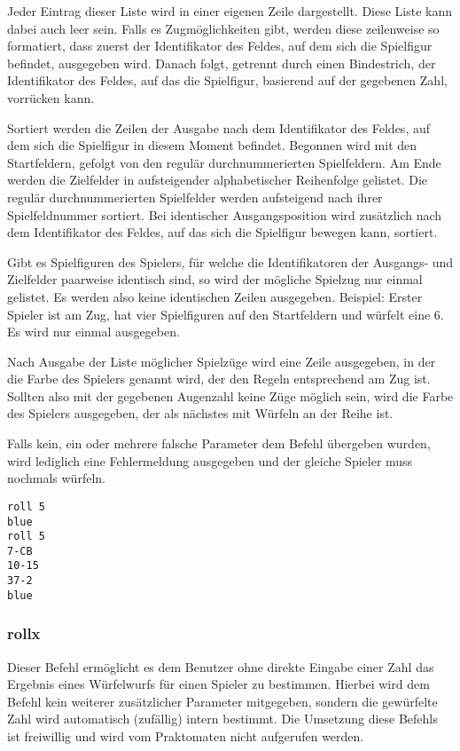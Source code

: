 Jeder Eintrag dieser Liste wird in einer eigenen Zeile dargestellt. Diese Liste kann dabei auch leer sein. Falls es Zugmöglichkeiten gibt, werden diese zeilenweise so formatiert, dass zuerst der Identifikator des Feldes, auf dem sich die Spielfigur befindet, ausgegeben wird. Danach folgt, getrennt durch einen Bindestrich, der Identifikator des Feldes, auf das die Spielfigur, basierend auf der gegebenen Zahl, vorrücken kann.

Sortiert werden die Zeilen der Ausgabe nach dem Identifikator des Feldes, auf dem sich die Spielfigur in diesem Moment befindet. Begonnen wird mit den Startfeldern, gefolgt von den regulär durchnummerierten Spielfeldern. Am Ende werden die Zielfelder in aufsteigender alphabetischer Reihenfolge gelistet. Die regulär durchnummerierten Spielfelder werden aufsteigend nach ihrer Spielfeldnummer sortiert. Bei identischer Ausgangsposition wird zusätzlich nach dem Identifikator des Feldes, auf das sich die Spielfigur bewegen kann, sortiert.

Gibt es Spielfiguren des Spielers, für welche die Identifikatoren der Ausgangs- und Zielfelder paarweise identisch sind, so wird der mögliche Spielzug nur einmal gelistet. Es werden also keine identischen Zeilen ausgegeben. Beispiel: Erster Spieler ist am Zug, hat vier Spielfiguren auf den Startfeldern und würfelt eine 6. Es wird nur einmal  ausgegeben. 

Nach Ausgabe der Liste möglicher Spielzüge wird eine Zeile ausgegeben, in der die Farbe des Spielers genannt wird, der den Regeln entsprechend am Zug ist.
Sollten also mit der gegebenen Augenzahl keine Züge möglich sein, wird die Farbe des Spielers ausgegeben, der als nächstes mit Würfeln an der Reihe ist.

Falls kein, ein oder mehrere falsche Parameter dem Befehl übergeben wurden, wird lediglich eine Fehlermeldung ausgegeben und der gleiche Spieler muss nochmals würfeln.

\begin{tcolorbox}[title=Beispiel]
\begin{verbatim}
roll 5
blue
roll 5
7-CB
10-15
37-2
blue
\end{verbatim}
\end{tcolorbox}

\subsubsection*{rollx}
Dieser Befehl ermöglicht es dem Benutzer ohne direkte Eingabe einer Zahl das Ergebnis eines Würfelwurfs für einen Spieler zu bestimmen. Hierbei wird dem Befehl kein weiterer zusätzlicher Parameter mitgegeben, sondern die gewürfelte Zahl wird automatisch (zufällig) intern bestimmt. Die Umsetzung diese Befehls ist freiwillig und wird vom Praktomaten nicht aufgerufen werden.
